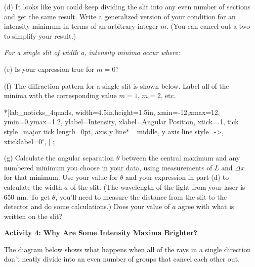 (d) It looks like you could keep dividing the slit into any even number of sections and get the same result.  Write a generalized version of your condition for an intensity minimum in terms of an arbitrary integer $m$.  (You can cancel out a two to simplify your result.)

\answerspace{0.1in}
\hspace{0.8in}\textit{For a single slit of width \textit{a}, intensity \textit{minima} occur where: }
\answerspace{0.1in}

(e) Is your expression true for $m=0$?
\answerspace{0.4in}

(f) The diffraction pattern for a single slit is shown below.  Label all of the minima with the corresponding value $m=1$, $m=2$, etc.  
\label{fraunhofer_graph}

\begin{lab_axis}*[lab_noticks_4quads,
	width=4.5in,height=1.5in,
	xmin=-12,xmax=12,
	ymin=0,ymax=1.2,
	ylabel=Intensity,
	xlabel=Angular Position,
	xtick={.1}, %
	tick style={major tick length=0pt},
	axis y line*= {middle, y axis line style={->}}, %
	xticklabel={0$^\circ$},
]
;
\end{lab_axis}

\pagebreak[3]

(g) Calculate the angular separation $\theta$ between the central maximum and any numbered minimum you choose in your data, using measurements of $L$ and $\Delta x$ for that minimum.  Use your value for $\theta$ and your expression in part (d) to calculate the width $a$ of the slit.  (The wavelength of the light from your laser is 650 nm.  To get $\theta$, you'll need to measure the distance from the slit to the detector and do some calculations.)    Does your value of $a$ agree with what is written on the slit?
\answerspace{1.0in}


\textbf{Activity 4: Why Are Some Intensity Maxima Brighter?}

The diagram below shows what happens when all of the rays in a single direction don't neatly divide into an even number of groups that cancel each other out.

